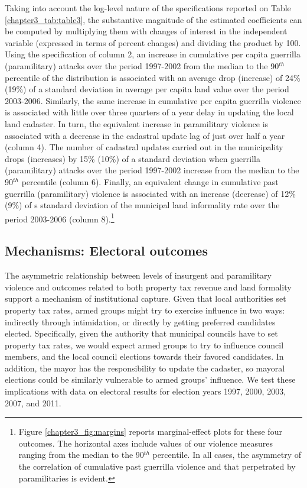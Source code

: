 Taking into account the log-level nature of the specifications reported on Table \ref{chapter3_tab:table3}, the substantive magnitude of the estimated coefficients can be computed by multiplying them with changes of interest in the independent variable (expressed in terms of percent changes) and dividing the product by 100. Using the specification of column 2, an increase in cumulative per capita guerrilla (paramilitary) attacks over the period 1997-2002 from the median to the 90$^{th}$ percentile of the distribution is associated with an average drop (increase) of 24\% (19\%) of a standard deviation in average per capita land value over the period 2003-2006. Similarly, the same increase in cumulative per capita guerrilla violence is associated with little over three quarters of a year delay in updating the local land cadaster. In turn, the equivalent increase in paramilitary violence is associated with a decrease in the cadastral update lag of just over half a year (column 4). The number of cadastral updates carried out in the municipality drops (increases) by 15\% (10\%) of a standard deviation when guerrilla (paramilitary) attacks over the period 1997-2002 increase from the median to the 90$^{th}$ percentile (column 6). Finally, an equivalent change in cumulative past guerrilla (paramilitary) violence is associated with an increase (decrease) of 12\% (9\%) of s standard deviation of the municipal land informality rate over the period 2003-2006 (column 8).\footnote{Figure \ref{chapter3_fig:margins} reports marginal-effect plots for these four outcomes. The horizontal axes include values of our violence measures ranging from the median to the 90$^{th}$ percentile. In all cases, the asymmetry of the correlation of cumulative past guerrilla violence and that perpetrated by paramilitaries is evident.}


\subsection{Mechanisms: Electoral outcomes}

The asymmetric relationship between levels of insurgent and paramilitary violence and outcomes related to both property tax revenue and land formality support a mechanism of institutional capture. Given that local authorities set property tax rates, armed groups might try to exercise influence in two ways: indirectly through intimidation, or directly by getting preferred candidates elected. Specifically, given the authority that municipal councils have to set property tax rates, we would expect armed groups to try to influence council members, and the local council elections towards their favored candidates. In addition, the mayor has the responsibility to update the cadaster, so mayoral elections could be similarly vulnerable to armed groups' influence. 
We test these implications with data on electoral results for election years 1997, 2000, 2003, 2007, and 2011. 

